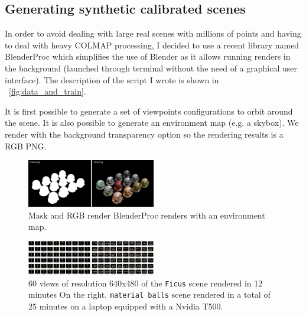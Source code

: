 \subsection{Generating synthetic calibrated scenes}
\label{sec:synthetic_calibrated_scenes}
In order to avoid dealing with large real scenes with millions of points and having to deal with heavy COLMAP processing, I decided to use a recent library named BlenderProc  \cite{Denninger2023} which simplifies the use of Blender as it allows running renders in the background (launched through terminal without the need of a graphical user interface).
The description of the script I wrote is shown in ~\cref{fig:data_and_train}.

It is first possible to generate a set of viewpoints configurations to orbit around the scene. It is also possible to generate an environment map (e.g. a skybox). We render with the background transparency option so the rendering results is a RGB PNG. 

\begin{figure}[H]
    \centering
    \includegraphics[width=0.5\textwidth]{figures/blenderproc_renders.png}
    \caption{Mask and RGB render BlenderProc renders with an environment map.}
    \label{fig:blenderproc_renders}
\end{figure}

\begin{figure}[H]
    \centering
    \includegraphics[width=0.5\textwidth]{figures/ficus_and_matballs.png}
    \caption{60 views of resolution 640x480 of the \texttt{Ficus} scene rendered in 12 minutes On the right, \texttt{material balls} scene rendered in a total of 25 minutes on a laptop equipped with a Nvidia T500.}
    \label{fig:multiview}
\end{figure}

